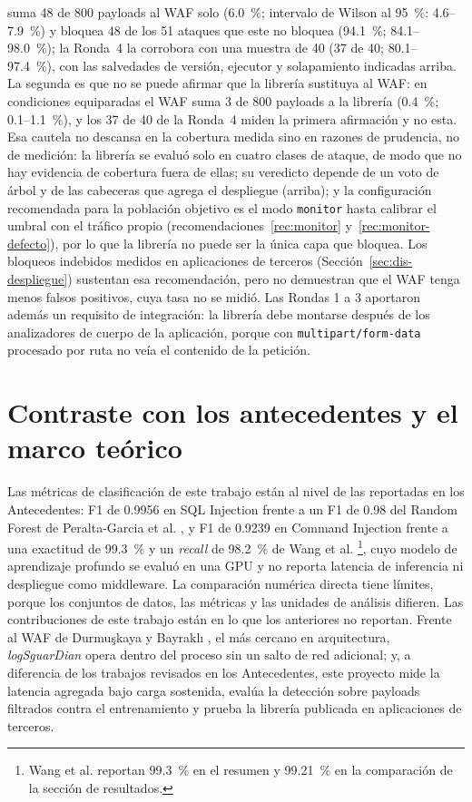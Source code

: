 suma 48 de 800 payloads al WAF solo (6.0~\%; intervalo de Wilson al 95~\%: 4.6--7.9~\%) y bloquea
48 de los 51 ataques que este no bloquea (94.1~\%; 84.1--98.0~\%); la Ronda~4 la corrobora con una
muestra de 40 (37 de 40; 80.1--97.4~\%), con las salvedades de versión, ejecutor y solapamiento
indicadas arriba. La segunda es que no se puede afirmar que la librería sustituya al WAF: en condiciones
equiparadas el WAF suma 3 de 800 payloads a la librería (0.4~\%; 0.1--1.1~\%), y los 37 de 40 de la
Ronda~4 miden la primera afirmación y no esta. Esa cautela no descansa en la cobertura medida sino
en razones de prudencia, no de medición: la librería se evaluó solo en cuatro clases de ataque, de
modo que no hay evidencia de cobertura fuera de ellas; su veredicto depende de un voto de árbol y de
las cabeceras que agrega el despliegue (arriba); y la configuración recomendada para la población
objetivo es el modo \texttt{monitor} hasta calibrar el umbral con el tráfico propio
(recomendaciones~\ref{rec:monitor} y~\ref{rec:monitor-defecto}), por lo que la librería no puede ser
la única capa que bloquea. Los bloqueos indebidos medidos en aplicaciones de terceros
(Sección~\ref{sec:dis-despliegue}) sustentan esa recomendación, pero no demuestran que el WAF tenga
menos falsos positivos, cuya tasa no se midió. Las Rondas 1 a 3 aportaron
además un requisito de integración: la librería debe montarse después de los analizadores de
cuerpo de la aplicación, porque con \texttt{multipart/form-data} procesado por ruta no veía el
contenido de la petición.

\section{Contraste con los antecedentes y el marco teórico}

Las métricas de clasificación de este trabajo están al nivel de las reportadas en los
Antecedentes: F1 de 0.9956 en SQL Injection frente a un F1 de 0.98 del Random Forest de Peralta-Garcia et al.
\cite{peralta2024sql}, y F1 de 0.9239 en Command Injection frente a una exactitud de 99.3~\% y un
\textit{recall} de 98.2~\% de Wang et al. \cite{seyyar2024}\footnote{Wang et al. reportan 99.3~\% en
el resumen y 99.21~\% en la comparación de la sección de resultados.}, cuyo modelo de aprendizaje
profundo se evaluó en una GPU y no reporta latencia de inferencia ni despliegue como middleware. La comparación numérica directa tiene límites, porque los
conjuntos de datos, las métricas y las unidades de análisis difieren. Las contribuciones de este
trabajo están en lo que los anteriores no reportan. Frente al WAF de Durmuşkaya y Bayraklı \cite{durmuskaya2025waf}, el más cercano en arquitectura, \textit{logSguarDian} opera dentro del proceso sin un salto de red
adicional; y, a diferencia de los trabajos revisados en los Antecedentes, este proyecto mide la latencia agregada
bajo carga sostenida, evalúa la detección sobre payloads filtrados contra el entrenamiento y prueba
la librería publicada en aplicaciones de terceros.

